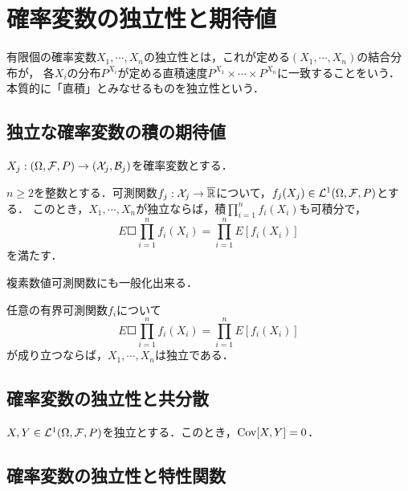 \documentclass[uplatex,dvipdfmx]{jsreport}
\begin{document}
\section{確率変数の独立性と期待値}

\begin{tcolorbox}[colframe=ForestGreen, colback=ForestGreen!10!white,breakable,colbacktitle=ForestGreen!40!white,coltitle=black,fonttitle=\bfseries\sffamily,
title=]
    有限個の確率変数$X_1,\cdots,X_n$の独立性とは，これが定める$(X_1,\cdots,X_n)$の結合分布が，
    各$X_i$の分布$P^{X_i}$が定める直積速度$P^{X_1}\times\cdots\times P^{X_n}$に一致することをいう．
    本質的に「直積」とみなせるものを独立性という．
\end{tcolorbox}

\subsection{独立な確率変数の積の期待値}

\begin{notation}
    $X_j:(\Omega,\mathcal{F},P)\to(\mathcal{X}_j,\mathcal{B}_j)$を確率変数とする．
\end{notation}

\begin{proposition}
    $n\ge 2$を整数とする．可測関数$f_j:\mathcal{X}_j\to\overline{\mathbb{R}}$について，$f_j(X_j)\in\mathcal{L}^1(\Omega,\mathcal{F},P)$とする．
    このとき，$X_1,\cdots,X_n$が独立ならば，積$\prod^n_{i=1}f_i(X_i)$も可積分で，
    \[E\Square{\prod^n_{i=1}f_i(X_i)}=\prod^n_{i=1}E[f_i(X_i)]\]
    を満たす．
\end{proposition}
\begin{remark}
    複素数値可測関数にも一般化出来る．
\end{remark}

\begin{corollary}[独立性の十分条件]
    任意の有界可測関数$f_i$について
    \[E\Square{\prod^n_{i=1}f_i(X_i)}=\prod^n_{i=1}E[f_i(X_i)]\]
    が成り立つならば，$X_1,\cdots,X_n$は独立である．
\end{corollary}

\subsection{確率変数の独立性と共分散}

\begin{proposition}
    $X,Y\in\mathcal{L}^1(\Omega,\mathcal{F},P)$を独立とする．このとき，$\mathrm{Cov}[X,Y]=0$．
\end{proposition}

\subsection{確率変数の独立性と特性関数}
\end{document}

